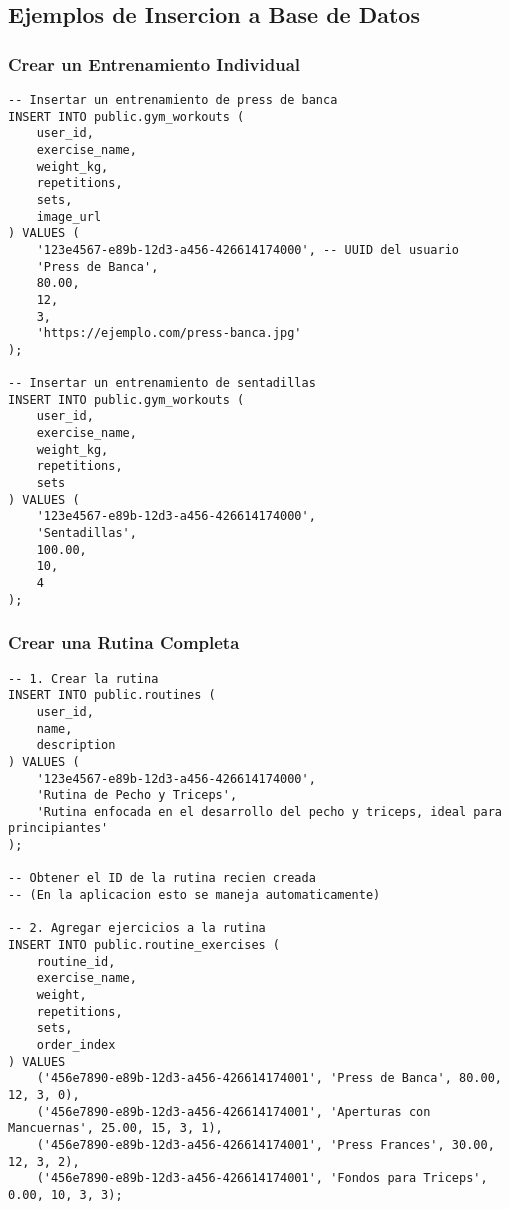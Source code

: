\documentclass[12pt,a4paper]{article}
\begin{document}
\subsection{Ejemplos de Insercion a Base de Datos}

\subsubsection{Crear un Entrenamiento Individual}

\begin{lstlisting}[style=sqlstyle, caption=Ejemplo de insercion en gym_workouts]
-- Insertar un entrenamiento de press de banca
INSERT INTO public.gym_workouts (
    user_id,
    exercise_name,
    weight_kg,
    repetitions,
    sets,
    image_url
) VALUES (
    '123e4567-e89b-12d3-a456-426614174000', -- UUID del usuario
    'Press de Banca',
    80.00,
    12,
    3,
    'https://ejemplo.com/press-banca.jpg'
);

-- Insertar un entrenamiento de sentadillas
INSERT INTO public.gym_workouts (
    user_id,
    exercise_name,
    weight_kg,
    repetitions,
    sets
) VALUES (
    '123e4567-e89b-12d3-a456-426614174000',
    'Sentadillas',
    100.00,
    10,
    4
);
\end{lstlisting}

\subsubsection{Crear una Rutina Completa}

\begin{lstlisting}[style=sqlstyle, caption=Ejemplo de creacion de rutina completa]
-- 1. Crear la rutina
INSERT INTO public.routines (
    user_id,
    name,
    description
) VALUES (
    '123e4567-e89b-12d3-a456-426614174000',
    'Rutina de Pecho y Triceps',
    'Rutina enfocada en el desarrollo del pecho y triceps, ideal para principiantes'
);

-- Obtener el ID de la rutina recien creada
-- (En la aplicacion esto se maneja automaticamente)

-- 2. Agregar ejercicios a la rutina
INSERT INTO public.routine_exercises (
    routine_id,
    exercise_name,
    weight,
    repetitions,
    sets,
    order_index
) VALUES 
    ('456e7890-e89b-12d3-a456-426614174001', 'Press de Banca', 80.00, 12, 3, 0),
    ('456e7890-e89b-12d3-a456-426614174001', 'Aperturas con Mancuernas', 25.00, 15, 3, 1),
    ('456e7890-e89b-12d3-a456-426614174001', 'Press Frances', 30.00, 12, 3, 2),
    ('456e7890-e89b-12d3-a456-426614174001', 'Fondos para Triceps', 0.00, 10, 3, 3);
\end{lstlisting}
\end{document}
